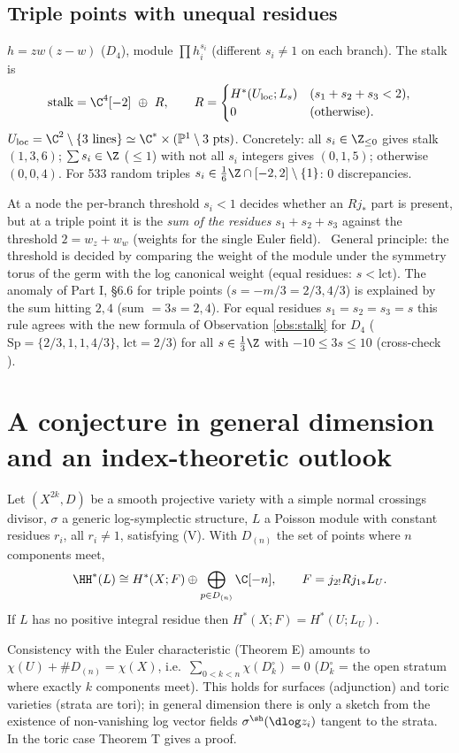 \subsection{Triple points with unequal residues}
\begin{obs}[\tV]\label{obs:triple}
$h=zw(z-w)$ ($D_4$), module $\prod h_i^{s_i}$ (different $s_i\ne1$ on each branch). The stalk is
\[\text{stalk}=\C^4[-2]\ \oplus\ R,\qquad R=\begin{cases}H^*(U_{\rm loc};L_s)&(s_1+s_2+s_3<2),\\0&(\text{otherwise}).\end{cases}\]
$U_{\rm loc}=\C^2\setminus\{3\text{ lines}\}\simeq\C^*\times(\mathbb P^1\setminus3\text{ pts})$. Concretely: all $s_i\in\Z_{\le0}$ gives stalk $(1,3,6)$; $\sum s_i\in\Z$ ($\le1$) with not all $s_i$ integers gives $(0,1,5)$; otherwise $(0,0,4)$. For 533 random triples $s_i\in\tfrac16\Z\cap[-2,2]\setminus\{1\}$: 0 discrepancies.
\end{obs}
At a node the per-branch threshold $s_i<1$ decides whether an $Rj_*$ part is present, but at a triple point it is the \emph{sum of the residues} $s_1+s_2+s_3$ against the threshold $2=w_z+w_w$ (weights for the single Euler field). \tK\ General principle: the threshold is decided by comparing the weight of the module under the symmetry torus of the germ with the log canonical weight (equal residues: $s<\mathrm{lct}$). The anomaly of Part I, \S6.6 for triple points ($s=-m/3=2/3,4/3$) is explained by the sum hitting $2,4$ (sum $=3s=2,4$). For equal residues $s_1=s_2=s_3=s$ this rule agrees with the new formula of Observation \ref{obs:stalk} for $D_4$ ($\mathrm{Sp}=\{2/3,1,1,4/3\}$, $\mathrm{lct}=2/3$) for all $s\in\tfrac13\Z$ with $-10\le3s\le10$ (cross-check \tV).

\section{A conjecture in general dimension and an index-theoretic outlook}\label{sec:conj}
\begin{conj}\tK\label{conj:gen}
Let $(X^{2k},D)$ be a smooth projective variety with a simple normal crossings divisor, $\sigma$ a generic log-symplectic structure, $L$ a Poisson module with constant residues $r_i$, all $r_i\ne1$, satisfying (V). With $D_{(n)}$ the set of points where $n$ components meet,
\[\HH^*(L)\cong H^*(X;F)\oplus\bigoplus_{p\in D_{(n)}}\C[-n],\qquad F=j_{2!}Rj_{1*}L_U.\]
If $L$ has no positive integral residue then $H^*(X;F)=H^*(U;L_U)$.
\end{conj}
Consistency with the Euler characteristic (Theorem E) amounts to $\chi(U)+\#D_{(n)}=\chi(X)$, i.e.\ $\sum_{0<k<n}\chi(D_k^\circ)=0$ ($D_k^\circ$ = the open stratum where exactly $k$ components meet). This holds for surfaces (adjunction) and toric varieties (strata are tori)\tP; in general dimension there is only a sketch from the existence of non-vanishing log vector fields $\sigma^\sh(\dlog z_i)$ tangent to the strata\tK. In the toric case Theorem T gives a proof.

